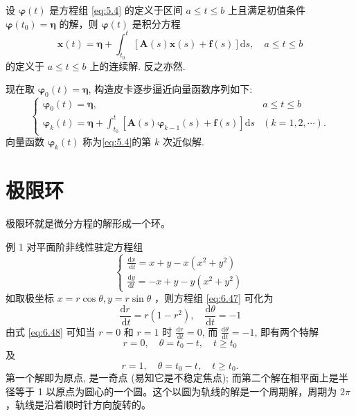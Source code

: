 \begin{proposition}
    设 $\boldsymbol{\varphi}(t)$ 是方程组 \ref{eq:5.4} 的定义于区间 $a \leqslant t \leqslant b$ 上且满足初值条件 $\boldsymbol{\varphi}\left(t_0\right)=\boldsymbol{\eta}$ 的解，则 $\boldsymbol{\varphi}(t)$ 是积分方程
    $$
        \boldsymbol{x}(t)=\boldsymbol{\eta}+\int_{t_0}^t[\boldsymbol{A}(s) \boldsymbol{x}(s)+\boldsymbol{f}(s)] \mathrm{d} s, \quad a \leqslant t \leqslant b
    $$
    的定义于 $a \leqslant t \leqslant b$ 上的连续解. 反之亦然.
\end{proposition}
现在取 $\boldsymbol{\varphi}_0(t)=\boldsymbol{\eta}$, 构造皮卡逐步逼近向量函数序列如下:
$$
    \begin{cases}\boldsymbol{\varphi}_0(t)=\boldsymbol{\eta}, & a \leqslant t \leqslant b \\ \boldsymbol{\varphi}_k(t)=\boldsymbol{\eta}+\int_{t_0}^t\left[\boldsymbol{A}(s) \boldsymbol{\varphi}_{k-1}(s)+\boldsymbol{f}(s)\right] \mathrm{d} s & (k=1,2, \cdots) .\end{cases}
$$
向量函数 $\boldsymbol{\varphi}_k(t)$ 称为\ref{eq:5.4}的第 $k$ 次近似解.

\section{极限环}

极限环就是微分方程的解形成一个环。

例 1 对平面阶非线性驻定方程组
\begin{equation}\label{eq:6.47}
    \begin{cases}
        \frac{\mathrm{d} x}{\mathrm{~d} t}=x+y-x\left(x^2+y^2\right) \\
        \frac{\mathrm{d} y}{\mathrm{d} t}=-x+y-y\left(x^2+y^2\right)
    \end{cases}
\end{equation}
如取极坐标 $x=r \cos \theta, y=r \sin \theta$ ，则方程组 \eqref{eq:6.47} 可化为
\begin{equation}\label{eq:6.48}
    \frac{\mathrm{d} r}{\mathrm{~d} t}=r\left(1-r^2\right), \quad \frac{\mathrm{d} \theta}{\mathrm{d} t}=-1
\end{equation}
由式 \eqref{eq:6.48} 可知当 $r=0$ 和 $r=1$ 时 $\frac{\mathrm{d} r}{\mathrm{~d} t}=0$, 而 $\frac{\mathrm{d} \theta}{\mathrm{d} t}=-1$, 即有两个特解
$$
    r=0, \quad \theta=t_0-t, \quad t \geqslant t_0
$$
及
$$
    r=1, \quad \theta=t_0-t, \quad t \geqslant t_0 .
$$
第一个解即为原点, 是一奇点 (易知它是不稳定焦点); 而第二个解在相平面上是半径等于 1 以原点为圆心的一个圆。这个以圆为轨线的解是一个周期解，周期为 $2 \pi$ ，轨线是沿着顺时针方向旋转的。

